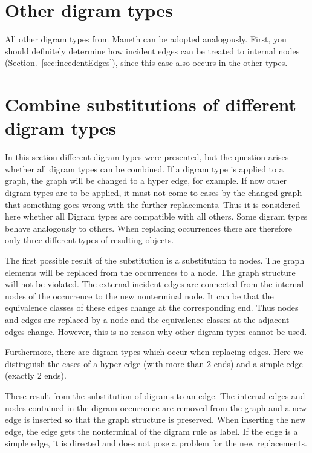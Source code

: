 \section{Other digram types}
All other digram types from Maneth can be adopted analogously. First, you should definitely determine how incident edges can be treated to internal nodes (Section.~\ref{sec:incedentEdges}), since this case also occurs in the other types.


\pagebreak
\section{Combine substitutions of different digram types}
In this section different digram types were presented, but the question arises whether all digram types can be combined. If a digram type is applied to a graph, the graph will be changed to a hyper edge, for example. If now other digram types are to be applied, it must not come to cases by the changed graph that something goes wrong with the further replacements. Thus it is considered here whether all Digram types are compatible with all others.
Some digram types behave analogously to others. When replacing occurrences there are therefore only three different types of resulting objects. 

The first possible result of the substitution is a substitution to nodes. The graph elements will be replaced from the occurrences to a node. The graph structure will not be violated. The external incident edges are connected from the internal nodes of the occurrence to the new nonterminal node. It can be that the equivalence classes of these edges change at the corresponding end. Thus nodes and edges are replaced by a node and the equivalence classes at the adjacent edges change. However, this is no reason why other digram types cannot be used.


Furthermore, there are digram types which occur when replacing edges. Here we distinguish the cases of a hyper edge (with more than 2 ends) and a simple edge (exactly 2 ends).

These result from the substitution of digrams to an edge. The internal edges and nodes contained in the digram occurrence are removed from the graph and a new edge is inserted so that the graph structure is preserved. When inserting the new edge, the edge gets the nonterminal of the digram rule as label. If the edge is a simple edge, it is directed and does not pose a problem for the new replacements.

